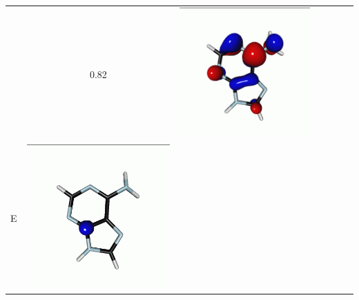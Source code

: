 \documentclass[journal=jctcce,manuscript=article]{achemso}
\begin{document}
\begin{table}[H]
\begin{tabular}{ l| c c c | c c c }
\begin{minipage}{0.2\textwidth}
    \end{minipage}
    & 0.82
    & 
    \begin{minipage}{0.2\textwidth}
        \centering
        \includegraphics[scale=0.10]{NTO/Adenine_C/5p_Cs.png}
    \end{minipage}
    \\
            E &  
    \begin{minipage}{0.2\textwidth}
        \centering
        \includegraphics[scale=0.10]{NTO/Adenine_C/6h_C1.png}

\end{minipage}
\end{tabular}
\end{table}
\end{document}
